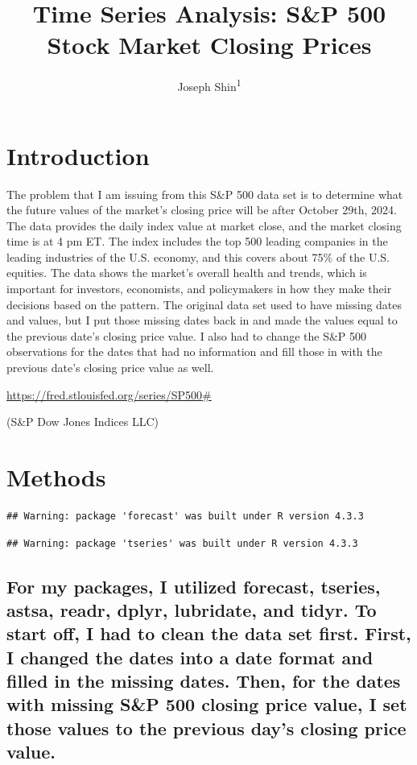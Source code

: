 \documentclass[
  man]{apa6}
\title{Time Series Analysis: S\&P 500 Stock Market Closing Prices}
\author{Joseph Shin\textsuperscript{1}}
\date{}
\affiliation{\vspace{0.5cm}\textsuperscript{joseph36} UIUC}
\begin{document}
\maketitle

\section{Introduction}\label{introduction}

The problem that I am issuing from this S\&P 500 data set is to determine what the future values of the market's closing price will be after October 29th, 2024. The data provides the daily index value at market close, and the market closing time is at 4 pm ET. The index includes the top 500 leading companies in the leading industries of the U.S. economy, and this covers about 75\% of the U.S. equities. The data shows the market's overall health and trends, which is important for investors, economists, and policymakers in how they make their decisions based on the pattern. The original data set used to have missing dates and values, but I put those missing dates back in and made the values equal to the previous date's closing price value. I also had to change the S\&P 500 observations for the dates that had no information and fill those in with the previous date's closing price value as well.

\url{https://fred.stlouisfed.org/series/SP500\#}

(S\&P Dow Jones Indices LLC)

\section{Methods}\label{methods}

\begin{verbatim}
## Warning: package 'forecast' was built under R version 4.3.3
\end{verbatim}

\begin{verbatim}
## Warning: package 'tseries' was built under R version 4.3.3
\end{verbatim}

\subsection{For my packages, I utilized forecast, tseries, astsa, readr, dplyr, lubridate, and tidyr. To start off, I had to clean the data set first. First, I changed the dates into a date format and filled in the missing dates. Then, for the dates with missing S\&P 500 closing price value, I set those values to the previous day's closing price value.}\label{for-my-packages-i-utilized-forecast-tseries-astsa-readr-dplyr-lubridate-and-tidyr.-to-start-off-i-had-to-clean-the-data-set-first.-first-i-changed-the-dates-into-a-date-format-and-filled-in-the-missing-dates.-then-for-the-dates-with-missing-sp-500-closing-price-value-i-set-those-values-to-the-previous-days-closing-price-value.}
\end{document}
